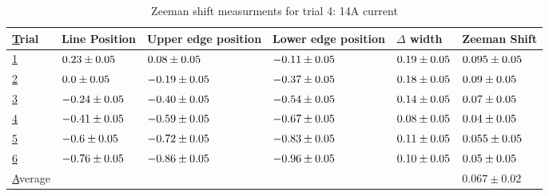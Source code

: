 \begin{table}[H]
    \begin{adjustwidth}{-100pt}{-100pt}
        \centering
        \begin{tabular}{|l|l|l|l|l|l|}
            \hline
            {\ul Trial}   & Line Position                & Upper edge position          & Lower edge position          & $\Delta$ width              & Zeeman Shift                 \\ \hline
            {\ul 1}       & $0.23 \pm 0.05$  & $0.08 \pm 0.05$  & $-0.11 \pm 0.05$ & $0.19 \pm 0.05$ & $0.095 \pm 0.05$ \\ \hline
            {\ul 2}       & $0.0 \pm 0.05$   & $-0.19 \pm 0.05$ & $-0.37 \pm 0.05$ & $0.18 \pm 0.05$ & $0.09 \pm 0.05$  \\ \hline
            {\ul 3}       & $-0.24 \pm 0.05$ & $-0.40 \pm 0.05$ & $-0.54 \pm 0.05$ & $0.14 \pm 0.05$ & $0.07 \pm 0.05$  \\ \hline
            {\ul 4}       & $-0.41 \pm 0.05$ & $-0.59 \pm 0.05$ & $-0.67 \pm 0.05$ & $0.08 \pm 0.05$ & $0.04 \pm 0.05$  \\ \hline
            {\ul 5}       & $-0.6 \pm 0.05$  & $-0.72 \pm 0.05$ & $-0.83 \pm 0.05$ & $0.11 \pm 0.05$ & $0.055 \pm 0.05$ \\ \hline
            {\ul 6}       & $-0.76 \pm 0.05$ & $-0.86 \pm 0.05$ & $-0.96 \pm 0.05$ & $0.10 \pm 0.05$ & $0.05 \pm 0.05$  \\ \hline
            {\ul Average} &                              &                              &                              &                             & $0.067 \pm 0.02$             \\ \hline
        \end{tabular}
    \end{adjustwidth}

    \caption{Zeeman shift measurments for trial 4: 14A current}

\end{table}



